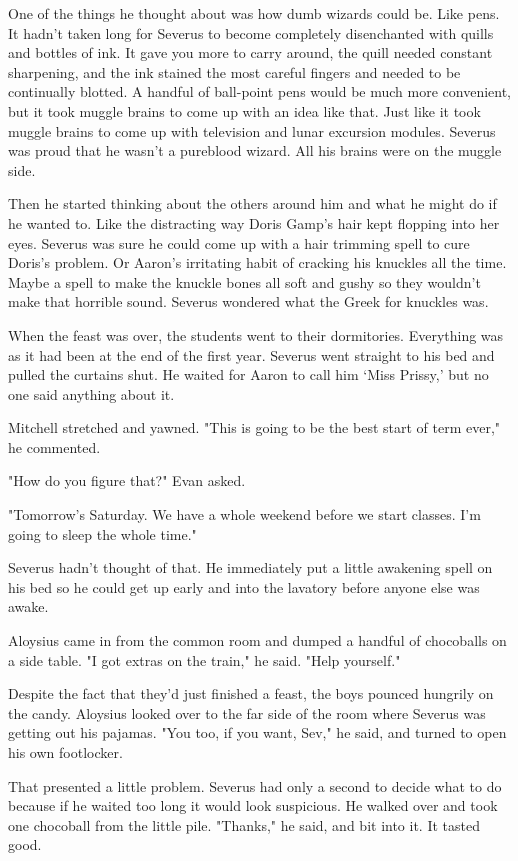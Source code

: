 One of the things he thought about was how dumb wizards could be. Like pens. It hadn't taken long for Severus to become completely disenchanted with quills and bottles of ink. It gave you more to carry around, the quill needed constant sharpening, and the ink stained the most careful fingers and needed to be continually blotted. A handful of ball-point pens would be much more convenient, but it took muggle brains to come up with an idea like that. Just like it took muggle brains to come up with television and lunar excursion modules. Severus was proud that he wasn't a pureblood wizard. All his brains were on the muggle side.

Then he started thinking about the others around him and what he might do if he wanted to. Like the distracting way Doris Gamp's hair kept flopping into her eyes. Severus was sure he could come up with a hair trimming spell to cure Doris's problem. Or Aaron's irritating habit of cracking his knuckles all the time. Maybe a spell to make the knuckle bones all soft and gushy so they wouldn't make that horrible sound. Severus wondered what the Greek for knuckles was.

When the feast was over, the students went to their dormitories. Everything was as it had been at the end of the first year. Severus went straight to his bed and pulled the curtains shut. He waited for Aaron to call him `Miss Prissy,' but no one said anything about it.

Mitchell stretched and yawned. "This is going to be the best start of term ever," he commented.

"How do you figure that?" Evan asked.

"Tomorrow's Saturday. We have a whole weekend before we start classes. I'm going to sleep the whole time."

Severus hadn't thought of that. He immediately put a little awakening spell on his bed so he could get up early and into the lavatory before anyone else was awake.

Aloysius came in from the common room and dumped a handful of chocoballs on a side table. "I got extras on the train," he said. "Help yourself."

Despite the fact that they'd just finished a feast, the boys pounced hungrily on the candy. Aloysius looked over to the far side of the room where Severus was getting out his pajamas. "You too, if you want, Sev," he said, and turned to open his own footlocker.

That presented a little problem. Severus had only a second to decide what to do because if he waited too long it would look suspicious. He walked over and took one chocoball from the little pile. "Thanks," he said, and bit into it. It tasted good.

